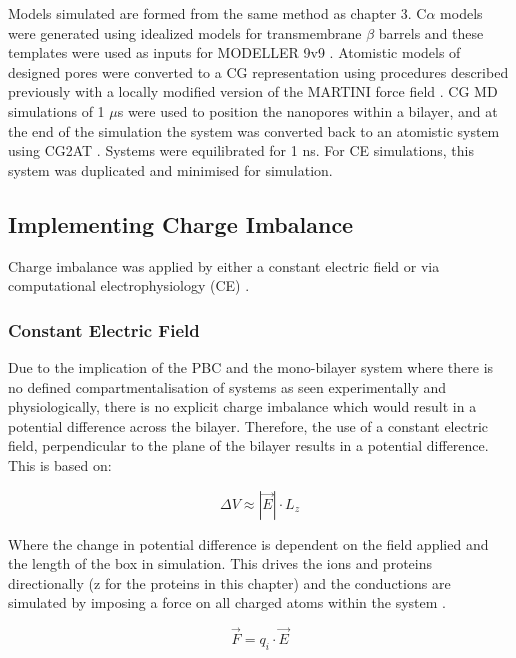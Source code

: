 Models simulated are formed from the same method as chapter 3. C$\alpha$ models were generated using idealized models for transmembrane $\beta$ barrels \cite{Sansom1995} and these templates were used as inputs for MODELLER 9v9 \cite{Sali1993}. Atomistic models of designed pores were converted to a CG representation using procedures described previously with a locally modified version of the MARTINI force field \cite{Bond2007}. CG MD simulations of 1 $\mu$s were used to position the nanopores within a bilayer, and at the end of the simulation the system was converted back to an atomistic system using CG2AT \cite{Stansfeld2011}. Systems were equilibrated for 1 ns. For CE simulations, this system was duplicated and minimised for simulation.

\subsection{Implementing Charge Imbalance}

Charge imbalance was applied by either a constant electric field \cite{Gumbart2012} or via computational electrophysiology (CE) \cite{Kutzner2011}. 

\subsubsection*{Constant Electric Field}

Due to the implication of the PBC and the mono-bilayer system where there is no defined compartmentalisation of systems as seen experimentally and physiologically, there is no explicit charge imbalance which would result in a potential difference across the bilayer. Therefore, the use of a constant electric field, perpendicular to the plane of the bilayer results in a potential difference. This is based on:

\begin{equation}
\Delta V \approx |\overrightarrow{E}|\cdot L_z
\label{eq:constantfield_1}
\end{equation}

Where the change in potential difference is dependent on the field applied and the length of the box in simulation. This drives the ions and proteins directionally (z for the proteins in this chapter) \cite{Suenaga1998,Tieleman2001x} and the conductions are simulated by imposing a force on all charged atoms within the system \cite{Sachs2004,Aksimentiev2005a,Crozier2001,Wells2007}.

\begin{equation}
\overrightarrow{F} = q_i\cdot \overrightarrow{E}
\label{eq:constantfield_2}
\end{equation}

